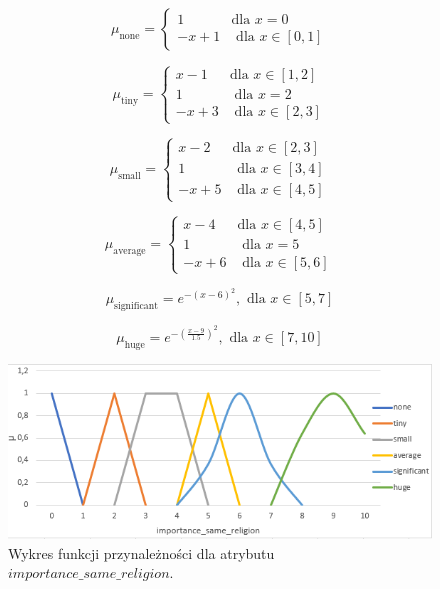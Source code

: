 \documentclass{classrep}
\begin{document}
\begin{enumerate}
    \begin{equation}
      \mu_{\text{none}} =
        \begin{cases}
          1 & \text{dla } x =0 \\
          -x +1 & \text{ dla } x \in [0,1]
        \end{cases}  
    \end{equation}

    \begin{equation}
      \mu_{\text{tiny}} =
        \begin{cases}
          x-1 & \text{dla } x \in [1,2] \\
          1 & \text{ dla } x =2 \\
          -x+3 & \text{ dla } x \in [2,3]       
        \end{cases}  
    \end{equation}

    \begin{equation}
      \mu_{\text{small}} =
        \begin{cases}
          x-2 & \text{dla } x \in [2,3] \\
          1 & \text{ dla } x \in [3,4] \\
          -x+5 & \text{ dla } x \in [4,5]       
        \end{cases}  
    \end{equation}

    \begin{equation}
      \mu_{\text{average}} =
        \begin{cases}
          x-4 & \text{dla } x \in [4,5] \\
          1 & \text{ dla } x =5 \\
          -x+6 & \text{ dla } x \in [5,6]       
        \end{cases}  
    \end{equation}

    \begin{equation}
      \mu_{\text{significant}} = e^{-{(x-6)}^2}, \text{ dla } x \in [5,7]
    \end{equation}

    \begin{equation}
      \mu_{\text{huge}} = e^{-(\frac{x-9}{1.5})^2}, \text{ dla } x \in [7,10]
    \end{equation}

      \begin{figure}[H]
      \includegraphics{fp_rel.png}
      \caption{Wykres funkcji przynależności dla atrybutu \(importance\_same\_religion\).}
      \end{figure}
  


\end{enumerate}
\end{document}
